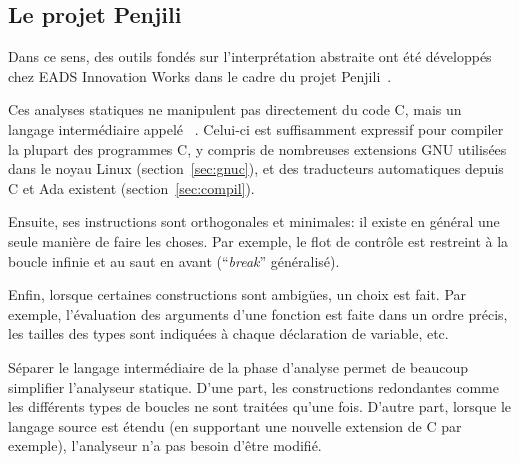 


\subsection*{Le projet Penjili}

Dans ce sens, des outils fondés sur l'interprétation abstraite ont été
développés chez EADS Innovation Works dans le cadre du projet
Penjili~\cite{AllamigeonHymansSSTIC07}.

Ces analyses statiques ne manipulent pas directement du code C, mais un langage
intermédiaire appelé \newspeak~\cite{newspeak}. Celui-ci est suffisamment
expressif pour compiler la plupart des programmes C, y compris de nombreuses
extensions GNU utilisées dans le noyau Linux (section~\ref{sec:gnuc}), et des
traducteurs automatiques depuis C et Ada existent (section~\ref{sec:compil}).

Ensuite, ses instructions sont orthogonales et minimales: il existe en général
une seule manière de faire les choses. Par exemple, le flot de contrôle est
restreint à la boucle infinie et au saut en avant (\enquote{\emph{break}}
généralisé).

Enfin, lorsque certaines constructions sont ambigües, un choix est fait. Par
exemple, l'évaluation des arguments d'une fonction est faite dans un ordre
précis, les tailles des types sont indiquées à chaque déclaration de variable,
etc.

Séparer le langage intermédiaire de la phase d'analyse permet de beaucoup
simplifier l'analyseur statique. D'une part, les constructions redondantes comme
les différents types de boucles ne sont traitées qu'une fois. D'autre part,
lorsque le langage source est étendu (en supportant une nouvelle extension de C
par exemple), l'analyseur n'a pas besoin d'être modifié.

